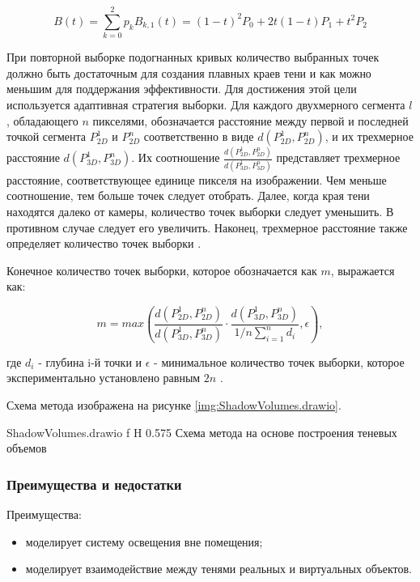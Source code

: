 \begin{equation}
	B(t) = \sum_{k=0}^{2} p_k B_{k, 1} (t) = (1 - t) ^ 2 P_0 + 2t(1 - t)P_1 + t^2 P_2
\end{equation}

При повторной выборке подогнанных кривых количество выбранных точек должно быть достаточным для создания плавных краев тени и как можно меньшим для поддержания эффективности. Для достижения этой цели используется адаптивная стратегия выборки. Для каждого двухмерного сегмента $l$, обладающего $n$ пикселями, обозначается расстояние между первой и последней точкой сегмента $P_{2D}^1$ и $P_{2D}^n$ соответственно в виде $d(P_{2D}^1, P_{2D}^n)$, и их трехмерное расстояние $d(P_{3D}^1, P_{3D}^n)$. Их соотношение $\frac{d(P_{2D}^1, P_{2D}^n)}{d(P_{3D}^1, P_{3D}^n)}$ представляет трехмерное расстояние, соответствующее единице пикселя на изображении. Чем меньше соотношение, тем больше точек следует отобрать. Далее, когда края тени находятся далеко от камеры, количество точек выборки следует уменьшить. В противном случае следует его увеличить. Наконец, трехмерное расстояние также определяет количество точек выборки \cite{wei2019simulating}.

Конечное количество точек выборки, которое обозначается как $m$, выражается как:

\begin{equation}
	m = max(\frac{d(P_{2D}^1, P_{2D}^n)}{d(P_{3D}^1, P_{3D}^n)} \cdot \frac{d(P_{3D}^1, P_{3D}^n)}{1/n \sum_{i=1}^{n} d_i}, \epsilon),
\end{equation}

где $d_i$ - глубина i-й точки и $\epsilon$ - минимальное количество точек выборки, которое экспериментально установлено равным $2n$ \cite{wei2019simulating}.

Схема метода изображена на рисунке \ref{img:ShadowVolumes.drawio}.

	{ShadowVolumes.drawio}
	{f}
	{H}
	{0.575\textwidth}
	{Схема метода на основе построения теневых объемов}

\subsubsection*{Преимущества и недостатки}

Преимущества:
\begin{itemize}
	\item моделирует систему освещения вне помещения;
	\item моделирует взаимодействие между тенями реальных и виртуальных объектов.
\end{itemize}


